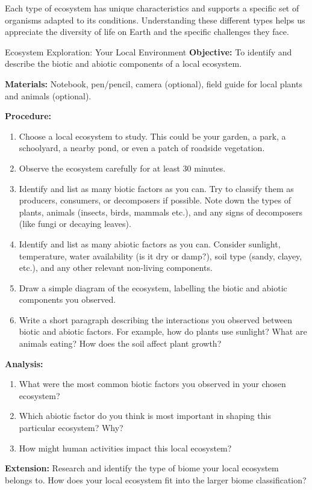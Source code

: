 Each type of ecosystem has unique characteristics and supports a specific set of organisms adapted to its conditions.  Understanding these different types helps us appreciate the diversity of life on Earth and the specific challenges they face.

\begin{investigation}{Ecosystem Exploration: Your Local Environment}
\textbf{Objective:} To identify and describe the biotic and abiotic components of a local ecosystem.

\textbf{Materials:} Notebook, pen/pencil, camera (optional), field guide for local plants and animals (optional).

\textbf{Procedure:}
\begin{enumerate}
    \item Choose a local ecosystem to study. This could be your garden, a park, a schoolyard, a nearby pond, or even a patch of roadside vegetation.
    \item Observe the ecosystem carefully for at least 30 minutes.
    \item Identify and list as many biotic factors as you can. Try to classify them as producers, consumers, or decomposers if possible.  Note down the types of plants, animals (insects, birds, mammals etc.), and any signs of decomposers (like fungi or decaying leaves).
    \item Identify and list as many abiotic factors as you can. Consider sunlight, temperature, water availability (is it dry or damp?), soil type (sandy, clayey, etc.), and any other relevant non-living components.
    \item Draw a simple diagram of the ecosystem, labelling the biotic and abiotic components you observed.
    \item Write a short paragraph describing the interactions you observed between biotic and abiotic factors. For example, how do plants use sunlight? What are animals eating? How does the soil affect plant growth?
\end{enumerate}

\textbf{Analysis:}
\begin{enumerate}
    \item What were the most common biotic factors you observed in your chosen ecosystem?
    \item Which abiotic factor do you think is most important in shaping this particular ecosystem? Why?
    \item How might human activities impact this local ecosystem?
\end{enumerate}

\textbf{Extension:} Research and identify the type of biome your local ecosystem belongs to.  How does your local ecosystem fit into the larger biome classification?
\end{investigation}

